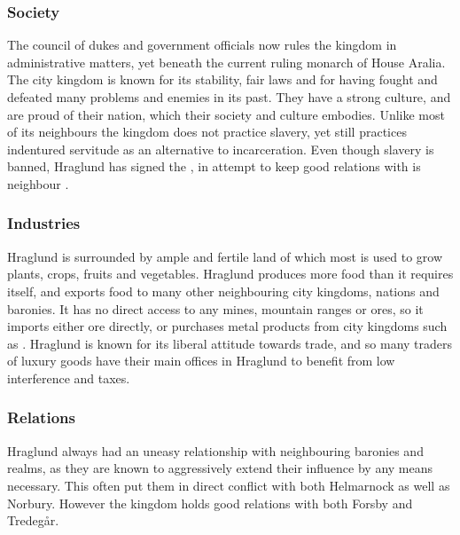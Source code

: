 \subsubsection{Society}

The council of dukes and government officials now rules the kingdom in
administrative matters, yet beneath the current ruling monarch of House
Aralia. The city kingdom is known for its stability, fair laws and for having
fought and defeated many problems and enemies in its past. They have a strong
culture, and are proud of their nation, which their society and culture
embodies. Unlike most of its neighbours the kingdom does not practice slavery,
yet still practices indentured servitude as an alternative to
incarceration. Even though slavery is banned, Hraglund has signed the
, in attempt to keep good relations with is
neighbour .

\subsubsection{Industries}

Hraglund is surrounded by ample and fertile land of which most is used to
grow plants, crops, fruits and vegetables. Hraglund produces more food than
it requires itself, and exports food to many other neighbouring city kingdoms,
nations and baronies. It has no direct access to any mines, mountain ranges or
ores, so it imports either ore directly, or purchases metal products from
city kingdoms such as . Hraglund is known for its liberal
attitude towards trade, and so many traders of luxury goods have their main
offices in Hraglund to benefit from low interference and taxes.

\subsubsection{Relations}

Hraglund always had an uneasy relationship with neighbouring baronies and
realms, as they are known to aggressively extend their influence by any means
necessary. This often put them in direct conflict with both Helmarnock as well
as Norbury. However the kingdom holds good relations with both Forsby and
Tredegår.
